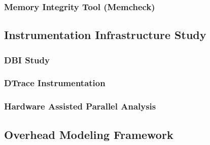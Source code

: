 \subsubsection{Memory Integrity Tool (Memcheck)}

\subsection{Instrumentation Infrastructure Study}
\subsubsection{DBI Study}
\subsubsection{DTrace Instrumentation}
\subsubsection{Hardware Assisted Parallel Analysis}
\subsection{Overhead Modeling Framework}
